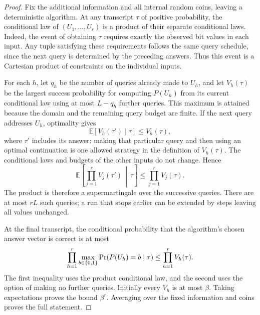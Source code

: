 \begin{proof}
Fix the additional information and all internal random coins, leaving a
deterministic algorithm.  At any transcript $\tau$ of positive
probability, the conditional law of $(U_1,\ldots,U_r)$ is a product of
their separate conditional laws.  Indeed, the event of obtaining $\tau$
requires exactly the observed bit values in each input.  Any tuple
satisfying these requirements follows the same query schedule, since
the next query is determined by the preceding answers.  Thus this event
is a Cartesian product of constraints on the individual inputs.

For each $h$, let $q_h$ be the number of queries already made to $U_h$,
and let $V_h(\tau)$ be the largest success probability for computing
$P(U_h)$ from its current conditional law using at most $L-q_h$ further
queries.  This maximum is attained because the domain and the remaining
query budget are finite.  If the next query addresses $U_h$, optimality
gives
\begin{equation}\label{eq:bellman-query}
 \mathbb E[V_h(\tau')\mid\tau]\leq V_h(\tau),
\end{equation}
where $\tau'$ includes its answer: making that particular query and
then using an optimal continuation is one allowed strategy in the
definition of $V_h(\tau)$.  The conditional laws and budgets of the
other inputs do not change.  Hence
\[
 \mathbb E\!\left[
   \prod_{j=1}^r V_j(\tau')\,\middle|\,\tau
 \right]
 \leq \prod_{j=1}^r V_j(\tau).
\]
The product is therefore a supermartingale over the successive queries.
There are at most $rL$ such queries; a run that stops earlier can be
extended by steps leaving all values unchanged.

At the final transcript, the conditional probability that the algorithm's
chosen answer vector is correct is at most
\[
 \prod_{h=1}^r
   \max_{b\in\{0,1\}}\Pr(P(U_h)=b\mid\tau)
 \leq \prod_{h=1}^r V_h(\tau).
\]
The first inequality uses the product conditional law, and the second
uses the option of making no further queries.  Initially every $V_h$
is at most $\beta$.  Taking expectations proves the bound $\beta^r$.
Averaging over the fixed information and coins proves the full statement.
\end{proof}

